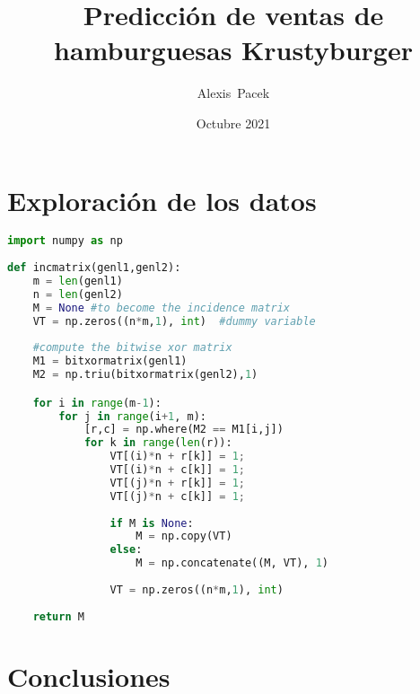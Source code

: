 \documentclass[11pt,spanish]{article}
\begin{document}
\renewcommand\Authfont{\fontsize{12}{14.4}\selectfont}
\renewcommand\Affilfont{\fontsize{9}{10.8}\itshape}
\renewcommand\Authand{,}
\renewcommand\Authands{,}

\title{Predicción de ventas de hamburguesas Krustyburger}

\author[1]{Alexis~Pacek}



\date{Octubre 2021}

\maketitle

\begin{abstract}


\end{abstract}

\section{Exploración de los datos}



\begin{lstlisting}[language=Python, caption=Python example]
import numpy as np
    
def incmatrix(genl1,genl2):
    m = len(genl1)
    n = len(genl2)
    M = None #to become the incidence matrix
    VT = np.zeros((n*m,1), int)  #dummy variable
    
    #compute the bitwise xor matrix
    M1 = bitxormatrix(genl1)
    M2 = np.triu(bitxormatrix(genl2),1) 

    for i in range(m-1):
        for j in range(i+1, m):
            [r,c] = np.where(M2 == M1[i,j])
            for k in range(len(r)):
                VT[(i)*n + r[k]] = 1;
                VT[(i)*n + c[k]] = 1;
                VT[(j)*n + r[k]] = 1;
                VT[(j)*n + c[k]] = 1;
                
                if M is None:
                    M = np.copy(VT)
                else:
                    M = np.concatenate((M, VT), 1)
                
                VT = np.zeros((n*m,1), int)
    
    return M
\end{lstlisting}





\section{Conclusiones}
\end{document}
